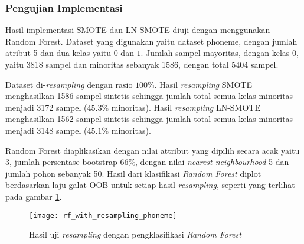 \subsubsection{Pengujian Implementasi}

Hasil implementasi SMOTE dan LN-SMOTE diuji dengan menggunakan Random Forest.
Dataset yang digunakan yaitu dataset phoneme, dengan jumlah atribut 5 dan
dua kelas yaitu $ 0 $ dan $ 1 $.
Jumlah sampel mayoritas, dengan kelas 0, yaitu 3818 sampel dan minoritas
sebanyak 1586, dengan total 5404 sampel.

Dataset di-\textit{resampling} dengan rasio $ 100\% $.
Hasil \textit{resampling} SMOTE menghasilkan 1586 sampel sintetis sehingga
jumlah total semua kelas minoritas menjadi 3172 sampel ($ 45.3\% $ minoritas).
Hasil \textit{resampling} LN-SMOTE menghasilkan 1562 sampel sintetis sehingga
jumlah total semua kelas minoritas menjadi 3148 sampel ($ 45.1\% $ minoritas).

Random Forest diaplikasikan dengan nilai attribut yang dipilih secara acak
yaitu 3, jumlah persentase bootstrap $ 66\% $, dengan nilai \textit{nearest
neighbourhood} 5 dan jumlah pohon sebanyak 50.
Hasil dari klasifikasi \textit{Random Forest} diplot berdasarkan laju galat OOB
untuk setiap hasil \textit{resampling}, seperti yang terlihat pada gambar
\ref{fig:rf_with_resampling_phoneme}.

\begin{figure}[t]
	\centering
	\texttt{[image: rf\_with\_resampling\_phoneme]}
	\caption{Hasil uji \textit{resampling} dengan pengklasifikasi \textit{Random Forest}}
	\label{fig:rf_with_resampling_phoneme}
\end{figure}
